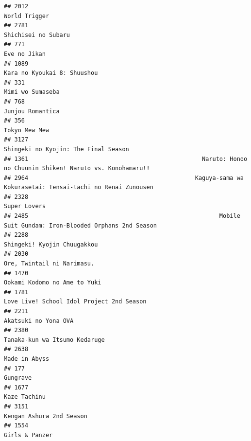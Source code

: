 \documentclass[
]{article}
\begin{document}
\begin{verbatim}
## 2012                                                                                             World Trigger
## 2781                                                                                       Shichisei no Subaru
## 771                                                                                               Eve no Jikan
## 1089                                                                               Kara no Kyoukai 8: Shuushou
## 331                                                                                           Mimi wo Sumaseba
## 768                                                                                           Junjou Romantica
## 356                                                                                              Tokyo Mew Mew
## 3127                                                                      Shingeki no Kyojin: The Final Season
## 1361                                                  Naruto: Honoo no Chuunin Shiken! Naruto vs. Konohamaru!!
## 2964                                                Kaguya-sama wa Kokurasetai: Tensai-tachi no Renai Zunousen
## 2328                                                                                              Super Lovers
## 2485                                                       Mobile Suit Gundam: Iron-Blooded Orphans 2nd Season
## 2288                                                                               Shingeki! Kyojin Chuugakkou
## 2030                                                                                Ore, Twintail ni Narimasu.
## 1470                                                                              Ookami Kodomo no Ame to Yuki
## 1781                                                                 Love Live! School Idol Project 2nd Season
## 2211                                                                                      Akatsuki no Yona OVA
## 2380                                                                             Tanaka-kun wa Itsumo Kedaruge
## 2638                                                                                             Made in Abyss
## 177                                                                                                   Gungrave
## 1677                                                                                              Kaze Tachinu
## 3151                                                                                  Kengan Ashura 2nd Season
## 1554                                                                                            Girls & Panzer

\end{verbatim}
\end{document}
